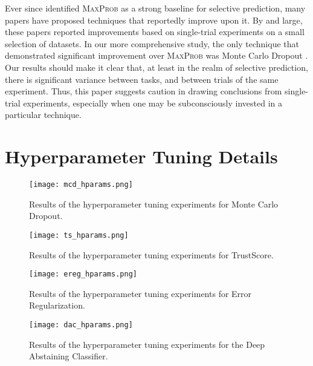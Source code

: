 \documentclass[11pt]{article}
\begin{document}
\noindent Ever since \cite{HendrycksG17} identified \textsc{MaxProb} as a strong baseline for selective prediction, many papers have proposed techniques that reportedly improve upon it. By and large, these papers reported improvements based on single-trial experiments on a small selection of datasets. In our more comprehensive study, the only technique that demonstrated significant improvement over \textsc{MaxProb} was Monte Carlo Dropout \cite{gal2016dropout}. Our results should make it clear that, at least in the realm of selective prediction, there is significant variance between tasks, and between trials of the same experiment. Thus, this paper suggests caution in drawing conclusions from single-trial experiments, especially when one may be subconsciously invested in a particular technique. 




\appendix

\section{Hyperparameter Tuning Details}
\label{sec:tuningappendix}


\begin{figure}
\centering
\texttt{[image: mcd\_hparams.png]}
\caption{Results of the hyperparameter tuning experiments for Monte Carlo Dropout.}
\label{fig:mcd_hparams}
\end{figure}

\begin{figure}
\centering
\texttt{[image: ts\_hparams.png]}
\caption{Results of the hyperparameter tuning experiments for TrustScore.}
\label{fig:ts_hparams}
\end{figure}

\begin{figure}
\centering
\texttt{[image: ereg\_hparams.png]}
\caption{Results of the hyperparameter tuning experiments for Error Regularization.}
\label{fig:ereg_hparams}
\end{figure}

\begin{figure}
\centering
\texttt{[image: dac\_hparams.png]}
\caption{Results of the hyperparameter tuning experiments for the Deep Abstaining Classifier.}
\label{fig:dac_hparams}
\end{figure}
\end{document}
